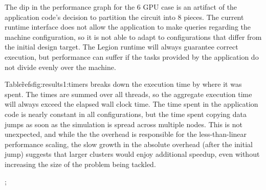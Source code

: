 The dip in the performance graph for the 6 GPU case is an artifact of the
application code's decision to partition the circuit into 8 pieces.  The
current runtime interface does not allow the application to make queries
regarding the machine configuration, so it is not able to adapt to
configurations that differ from the initial design target.  The Legion runtime
will always guarantee correct execution, but performance can suffer if the
tasks provided by the application do not divide evenly over the machine.

Table\~ref{sfig:results1:timers} breaks down the execution time by where it was
spent.  The times are summed over all threads, so the aggregate execution time
will always exceed the elapsed wall clock time.  The time spent in the 
application code is nearly constant in all configurations, but the time spent
copying data jumps as soon as the simulation is spread across multiple nodes.
This is not unexpected, and while the the overhead is responsible for the
less-than-linear performance scaling, the slow growth in the absolute overhead
(after the initial jump) suggests that larger clusters would enjoy additional
speedup, even without increasing the size of the problem being tackled.

;


